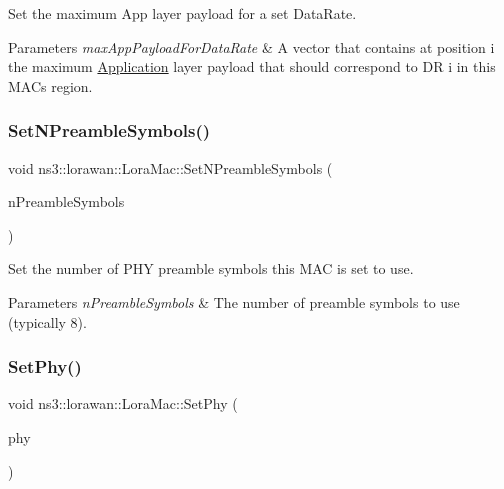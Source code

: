 Set the maximum App layer payload for a set Data\+Rate.


\begin{DoxyParams}{Parameters}
{\em max\+App\+Payload\+For\+Data\+Rate} & A vector that contains at position i the maximum \hyperlink{classApplication}{Application} layer payload that should correspond to DR i in this M\+AC\textquotesingle{}s region. \\
\hline
\end{DoxyParams}
\mbox{\label{classns3_1_1lorawan_1_1LoraMac_a26b6522eed72c69ebbac6a178521aeb0}} 
\subsubsection{\texorpdfstring{Set\+N\+Preamble\+Symbols()}{SetNPreambleSymbols()}}
{\footnotesize\ttfamily void ns3\+::lorawan\+::\+Lora\+Mac\+::\+Set\+N\+Preamble\+Symbols (\begin{DoxyParamCaption}\item[{int}]{n\+Preamble\+Symbols }\end{DoxyParamCaption})}

Set the number of P\+HY preamble symbols this M\+AC is set to use.


\begin{DoxyParams}{Parameters}
{\em n\+Preamble\+Symbols} & The number of preamble symbols to use (typically 8). \\
\hline
\end{DoxyParams}
\mbox{\label{classns3_1_1lorawan_1_1LoraMac_a924a856293cc8a21f7c476acb18f8b5f}} 
\subsubsection{\texorpdfstring{Set\+Phy()}{SetPhy()}}
{\footnotesize\ttfamily void ns3\+::lorawan\+::\+Lora\+Mac\+::\+Set\+Phy (\begin{DoxyParamCaption}\item[{Ptr$<$ \hyperlink{classns3_1_1lorawan_1_1LoraPhy}{Lora\+Phy} $>$}]{phy }\end{DoxyParamCaption})}

